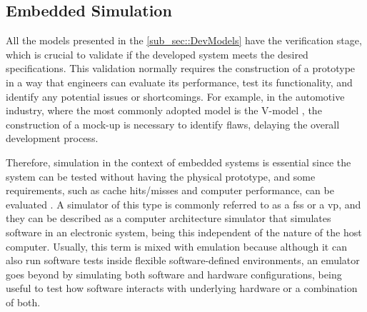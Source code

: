 




\subsection{Embedded Simulation}
\label{subSec::EmbeddedSim}

All the models presented in the \autoref{sub_sec::DevModels} have the verification stage, which is crucial to validate if the developed system 
meets the desired specifications. This validation normally requires the construction of a prototype in a way that engineers can evaluate its 
performance, test its functionality, and identify any potential issues or shortcomings. For example, in the automotive industry, where the most 
commonly adopted model is the V-model \cite{liu2016incremental}, the construction of a mock-up is necessary to identify flaws, delaying the 
overall development process. 

Therefore, simulation in the context of embedded systems is essential since the system can be tested without having the physical prototype, and 
some requirements, such as cache hits/misses and computer performance, can be evaluated \cite{pargem5}. A simulator of this type is commonly 
referred to as a \gls{fss} or a \gls{vp}, and they can be described as a computer architecture simulator that simulates software in an 
electronic system, being this independent of the nature of the host computer. Usually, this term is mixed with emulation because although it 
can also run software tests inside flexible software-defined environments, an emulator goes beyond by simulating both software and hardware 
configurations, being useful to test how software interacts with underlying hardware or a combination of both.

